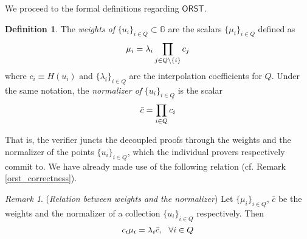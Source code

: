 \documentclass[10pt, psamsfonts, reqno]{amsart}
\theoremstyle{definition}
\newtheorem{defn}[thm]{Definition}
\theoremstyle{remark}
\newtheorem{rem}[thm]{Remark}
\numberwithin{equation}{section}
\begin{document}
\noindent
We proceed to the formal definitions regarding $\mathsf{ORST}$.

\begin{defn}\label{orst_weights_definition}
The \textit{weights of}
$\{u_i\}_{i \in Q} \subset \mathbb{G}$
are the scalars
$\{\mu_i\}_{i \in Q}$
defined as
\vspace{+2pt}
\begin{equation}\label{orst_weights}
\mu_i =\lambda_i \prod_{j \in Q \setminus \{i\}} c_j
\vspace{5pt}
\end{equation}
where $c_i \equiv H(u_i)$ and
$\{\lambda_i\}_{i \in Q }$ are the interpolation
coefficients for $Q$.
Under the same notation,
the \textit{normalizer of} $\{u_i\}_{i \in Q}$ is the scalar
\vspace{5pt}
\begin{equation}\label{orst_normalizer}
\bar{c} = \prod_{i \in Q} c_i
\vspace{5pt}
\end{equation}
\end{defn}
\noindent
That is, the verifier juncts the decoupled
proofs through the weights and the normalizer
of the points $\{u_i\}_{i \in Q}$,
which the individual provers respectively commit to.
We have already made use of
the following relation
(cf. Remark \ref{orst_correctness}).

\begin{rem}\label{orst_core_remark}
(\textit{Relation between weights and the normalizer})
Let $\{\mu_i\}_{i \in Q}$, $\bar{c}$ be the weights
and the normalizer of a collection $\{u_i\}_{i \in Q}$
respectively. Then
\vspace{5pt}
\begin{equation}\label{orst_core}
c_i \mu_i = \lambda_i \bar{c},\ \ \forall i \in Q
\vspace{5pt}
\end{equation}
\end{rem}
\end{document}
